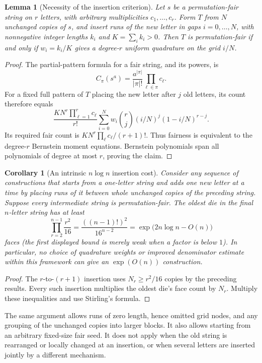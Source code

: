 \documentclass[11pt]{article}
\newtheorem{lemma}[theorem]{Lemma}
\newtheorem{corollary}[theorem]{Corollary}
\begin{document}
\begin{lemma}[Necessity of the insertion criterion]
Let $s$ be a permutation-fair string on $r$ letters, with arbitrary
multiplicities $c_1,\ldots,c_r$. Form $T$ from $N$ unchanged copies of
$s$, and insert runs of the new letter in gaps $i=0,\ldots,N$,
with nonnegative integer lengths $k_i$ and $K=\sum_i k_i>0$.
Then $T$ is permutation-fair if and only if $w_i=k_i/K$ gives a
degree-$r$ uniform quadrature on the grid $i/N$.
\end{lemma}
\begin{proof}
The partial-pattern formula for a fair string, and its powers, is
\[
 C_\pi(s^a)=\frac{a^{|\pi|}}{|\pi|!}
                  \prod_{\ell\in\pi}c_\ell.
\]
For a fixed full pattern of $T$ placing the new letter after $j$
old letters, its count therefore equals
\[
 \frac{KN^r\prod_{\ell=1}^r c_\ell}{r!}
  \sum_{i=0}^N w_i\binom rj(i/N)^j(1-i/N)^{r-j}.
\]
Its required fair count is
$KN^r\prod_\ell c_\ell/(r+1)!$. Thus fairness is equivalent to
the degree-$r$ Bernstein moment equations. Bernstein polynomials
span all polynomials of degree at most $r$, proving the claim.
\end{proof}

\begin{corollary}[An intrinsic $n\log n$ insertion cost]
Consider any sequence of constructions that starts from a one-letter
string and adds one new letter at a time by placing runs of it between
whole unchanged copies of the preceding string. Suppose every intermediate
string is permutation-fair. The oldest die in the final $n$-letter string
has at least
\[
 \prod_{r=2}^{n-1}\frac{r^2}{16}
 =\frac{((n-1)!)^2}{16^{n-2}}
 =\exp\bigl(2n\log n-O(n)\bigr)
\]
faces (the first displayed bound is merely weak when a factor is below $1$).
In particular, no choice of quadrature weights or improved denominator
estimate within this framework can give an $\exp(O(n))$ construction.
\end{corollary}
\begin{proof}
The $r$-to-$(r+1)$ insertion uses $N_r\ge r^2/16$ copies by the
preceding results. Every such insertion multiplies the oldest die's
face count by $N_r$. Multiply these inequalities and use Stirling's
formula.
\end{proof}

The same argument allows runs of zero length, hence omitted grid nodes,
and any grouping of the unchanged copies into larger blocks. It also
allows starting from an arbitrary fixed-size fair seed. It does not
apply when the old string is rearranged or locally changed at an insertion,
or when several letters are inserted jointly by a different mechanism.
\end{document}
